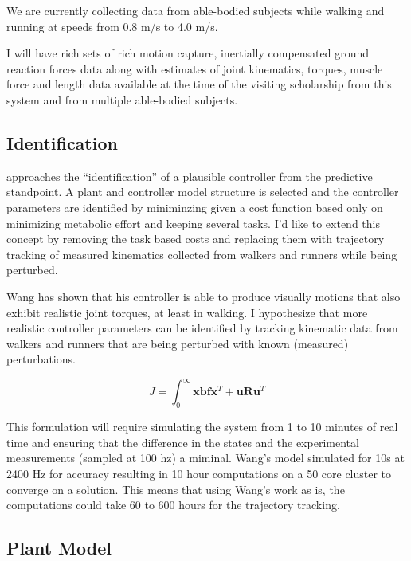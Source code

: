 \documentclass[11pt]{article}
\begin{document}
We are currently collecting data from able-bodied subjects while walking and
running at speeds from 0.8 m/s to 4.0 m/s.


I will have rich sets of rich motion capture, inertially compensated ground
reaction forces data along with estimates of joint kinematics, torques, muscle
force and length data available at the time of the visiting scholarship from
this system and from multiple able-bodied subjects.

\subsection{Identification}

\cite{Wang2012} approaches the ``identification'' of a plausible controller
from the predictive standpoint. A plant and controller model structure is
selected and the controller parameters are identified by miniminzing given a
cost function based only on minimizing metabolic effort and keeping several
tasks. I'd like to extend this concept by removing the task based costs and
replacing them with trajectory tracking of measured kinematics collected from
walkers and runners while being perturbed.

Wang has shown that his controller is able to produce visually motions that
also exhibit realistic joint torques, at least in walking. I hypothesize that
more realistic controller parameters can be identified by tracking kinematic
data from walkers and runners that are being perturbed with known (measured)
perturbations.

\begin{equation}
  J = \int_0^\infty \mathbf{x}\mathbf{bf}\mathbf{x}^T +
  \mathbf{u}\mathbf{R}\mathbf{u}^T
\end{equation}

This formulation will require simulating the system from 1 to 10 minutes of
real time and ensuring that the difference in the states and the experimental
measurements (sampled at 100 hz) a miminal. Wang's model simulated for 10s at
2400 Hz for accuracy resulting in 10 hour computations on a 50 core cluster to
converge on a solution. This means that using Wang's work as is, the
computations could take 60 to 600 hours for the trajectory tracking.

\subsection{Plant Model}
\end{document}
